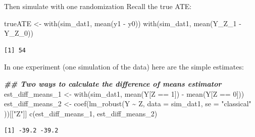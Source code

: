 \documentclass[
  ignorenonframetext,
]{beamer}
\newenvironment{Shaded}{\begin{snugshade}}{\end{snugshade}}
\newcommand{\AttributeTok}[1]{\textcolor[rgb]{0.77,0.63,0.00}{#1}}
\newcommand{\DecValTok}[1]{\textcolor[rgb]{0.00,0.00,0.81}{#1}}
\newcommand{\DocumentationTok}[1]{\textcolor[rgb]{0.56,0.35,0.01}{\textbf{\textit{#1}}}}
\newcommand{\FunctionTok}[1]{\textcolor[rgb]{0.00,0.00,0.00}{#1}}
\newcommand{\NormalTok}[1]{#1}
\newcommand{\OtherTok}[1]{\textcolor[rgb]{0.56,0.35,0.01}{#1}}
\newcommand{\SpecialCharTok}[1]{\textcolor[rgb]{0.00,0.00,0.00}{#1}}
\newcommand{\StringTok}[1]{\textcolor[rgb]{0.31,0.60,0.02}{#1}}
\begin{document}
\begin{frame}[fragile]{Then simulate with one randomization}
\protect\hypertarget{then-simulate-with-one-randomization}{}
Recall the true ATE:

\scriptsize

\begin{Shaded}
\begin{Highlighting}[]
\NormalTok{trueATE }\OtherTok{\textless{}{-}} \FunctionTok{with}\NormalTok{(sim\_dat1, }\FunctionTok{mean}\NormalTok{(y1 }\SpecialCharTok{{-}}\NormalTok{ y0))}
\FunctionTok{with}\NormalTok{(sim\_dat1, }\FunctionTok{mean}\NormalTok{(Y\_Z\_1 }\SpecialCharTok{{-}}\NormalTok{ Y\_Z\_0))}
\end{Highlighting}
\end{Shaded}

\begin{verbatim}
[1] 54
\end{verbatim}

\normalsize

In one experiment (one simulation of the data) here are the simple
estimates:

\scriptsize

\begin{Shaded}
\begin{Highlighting}[]
\DocumentationTok{\#\# Two ways to calculate the difference of means estimator}
\NormalTok{est\_diff\_means\_1 }\OtherTok{\textless{}{-}} \FunctionTok{with}\NormalTok{(sim\_dat1, }\FunctionTok{mean}\NormalTok{(Y[Z }\SpecialCharTok{==} \DecValTok{1}\NormalTok{]) }\SpecialCharTok{{-}} \FunctionTok{mean}\NormalTok{(Y[Z }\SpecialCharTok{==} \DecValTok{0}\NormalTok{]))}
\NormalTok{est\_diff\_means\_2 }\OtherTok{\textless{}{-}} \FunctionTok{coef}\NormalTok{(}\FunctionTok{lm\_robust}\NormalTok{(Y }\SpecialCharTok{\textasciitilde{}}\NormalTok{ Z,}
  \AttributeTok{data =}\NormalTok{ sim\_dat1,}
  \AttributeTok{se =} \StringTok{"classical"}
\NormalTok{))[[}\StringTok{"Z"}\NormalTok{]]}
\FunctionTok{c}\NormalTok{(est\_diff\_means\_1, est\_diff\_means\_2)}
\end{Highlighting}
\end{Shaded}

\begin{verbatim}
[1] -39.2 -39.2
\end{verbatim}

\normalsize
\end{frame}
\end{document}
